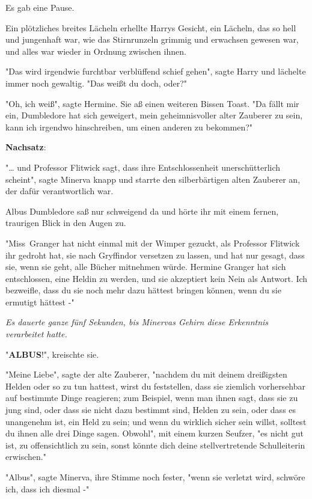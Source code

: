 {Es gab eine Pause.

Ein plötzliches breites Lächeln erhellte Harrys Gesicht, ein Lächeln, das so hell und jungenhaft war, wie das Stirnrunzeln grimmig und erwachsen gewesen war, und alles war wieder in Ordnung zwischen ihnen.

"Das wird irgendwie furchtbar verblüffend schief gehen", sagte Harry und lächelte immer noch gewaltig. "Das weißt du doch, oder?"

"Oh, ich weiß", sagte Hermine. Sie aß einen weiteren Bissen Toast. "Da fällt mir ein, Dumbledore hat sich geweigert, mein geheimnisvoller alter Zauberer zu sein, kann ich irgendwo hinschreiben, um einen anderen zu bekommen?"

\textbf{Nachsatz}:

"… und Professor Flitwick sagt, dass ihre Entschlossenheit unerschütterlich scheint", sagte Minerva knapp und starrte den silberbärtigen alten Zauberer an, der dafür verantwortlich war.

Albus Dumbledore saß nur schweigend da und hörte ihr mit einem fernen, traurigen Blick in den Augen zu.

"Miss~Granger hat nicht einmal mit der Wimper gezuckt, als Professor Flitwick ihr gedroht hat, sie nach Gryffindor versetzen zu lassen, und hat nur gesagt, dass sie, wenn sie geht, alle Bücher mitnehmen würde. Hermine Granger hat sich entschlossen, eine Heldin zu werden, und sie akzeptiert kein Nein als Antwort. Ich bezweifle, dass du sie noch mehr dazu hättest bringen können, wenn du sie ermutigt hättest -"

\emph{Es dauerte ganze fünf Sekunden, bis Minervas Gehirn diese Erkenntnis verarbeitet hatte.}

"\textbf{ALBUS}!", kreischte sie.

"Meine Liebe", sagte der alte Zauberer, "nachdem du mit deinem dreißigsten Helden oder so zu tun hattest, wirst du feststellen, dass sie ziemlich vorhersehbar auf bestimmte Dinge reagieren; zum Beispiel, wenn man ihnen sagt, dass sie zu jung sind, oder dass sie nicht dazu bestimmt sind, Helden zu sein, oder dass es unangenehm ist, ein Held zu sein; und wenn du wirklich sicher sein willst, solltest du ihnen alle drei Dinge sagen. Obwohl", mit einem kurzen Seufzer, "es nicht gut ist, zu offensichtlich zu sein, sonst könnte dich deine stellvertretende Schulleiterin erwischen."

"Albus", sagte Minerva, ihre Stimme noch fester, "wenn sie verletzt wird, schwöre ich, dass ich diesmal -"

}
